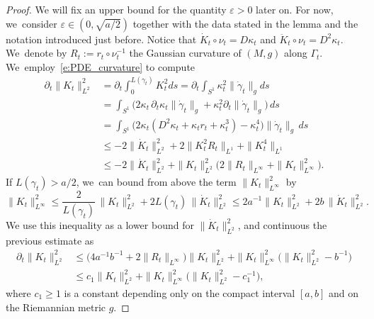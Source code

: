 \documentclass[JEP,XML,SOM,Unicode,NoFloatCountersInSection,published]{cedram}
\let\epsilon\varepsilon
\theoremstyle{plain}
\theoremstyle{definition}
\begin{document}
\begin{proof}
We will fix an upper bound for the quantity $\epsilon>0$ later on. For now, we~consider $\epsilon\in(0,\sqrt{a/2})$ together with the data stated in the lemma and the notation introduced just before. Notice that
$\dot K_t\circ\nu_t = D\kappa_t$ and $\ddot K_t\circ \nu_t=D^2\kappa_t$. We~denote by $R_t:=r_t\circ\nu_t^{-1}$ the Gaussian curvature of $(M,g)$ along $\Gamma_t$. We~employ~\eqref{e:PDE_curvature} to compute
\begin{align*}
\partial_t \|K_t\|_{L^2}^2
&=
\partial_t \int_{0}^{L(\gamma_t)}K_t^2 ds
=
\partial_t \int_{S^1}\kappa_t^2\|\dot\gamma_t\|_g ds\\
&=
\int_{S^1}\Big(2\kappa_t\,\partial_t\kappa_t\|\dot\gamma_t\|_g + \kappa_t^2\partial_t\|\dot\gamma_t\|_g\Big)\,ds\\
&=
\int_{S^1}\Big(2\kappa_t(D^2\kappa_t+\kappa_tr_t+\kappa_t^3)- \kappa_t^4\Big)\|\dot\gamma_t\|_g\,ds\\
&\leq
-2 \|\dot K_t\|_{L^2}^2 + 2 \|K_t^2R_t\|_{L^1} + \|K_t^4\|_{L^1}\\
& \leq
-2 \|\dot K_t\|_{L^2}^2 + \|K_t\|_{L^2}^2\Big(2 \|R_t\|_{L^\infty} + \|K_t\|_{L^\infty}^2 \Big).
\end{align*}
If $L(\gamma_t)>a/2$, we~can bound from above the term $\|K_t\|_{L^\infty}^2$ by
\[
\|K_t\|_{L^\infty}^2
\leq \frac2{L(\gamma_t)}\,\|K_t\|_{L^2}^2 + 2L(\gamma_t)\,\|\dot K_t\|_{L^2}^2
\leq 2a^{-1}\|K_t\|_{L^2}^2 + 2b\,\|\dot K_t\|_{L^2}^2 .
\]
We use this inequality as a lower bound for $\|\dot K_t\|_{L^2}^2$, and continuous the previous estimate as
\begin{equation}\label{e:estimate_Kt_L2_Zoll}
\begin{split}
\!\!\!\! \partial_t \|K_t\|_{L^2}^2
&\leq
\big(4a^{-1}b^{-1} + 2\|R_t\|_{L^\infty}\big) \|K_t\|_{L^2}^2 + \|K_t\|_{L^\infty}^2 \bigl(\|K_t\|_{L^2}^2 - b^{-1}\bigr) \\
&\leq
c_1 \|K_t\|_{L^2}^2 + \|K_t\|_{L^\infty}^2 \big(\|K_t\|_{L^2}^2 - c_1^{-1}\big),
\end{split}
\end{equation}
where $c_1\geq1$ is a constant depending only on the compact interval $[a,b]$ and on the Riemannian metric $g$.


\end{proof}
\end{document}
